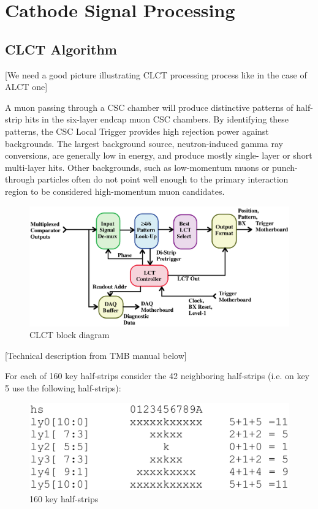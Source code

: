 \section{Cathode Signal Processing}
\label{sec:clct}

\subsection{CLCT Algorithm}
\label{subsec:clct_algo}

[We need a good picture illustrating CLCT processing process like in the case of ALCT one]

A muon passing through a CSC chamber will produce distinctive patterns of half-strip
hits in the six-layer endcap muon CSC chambers. By identifying these patterns, the CSC Local
Trigger provides high rejection power against backgrounds. The largest background source,
neutron-induced gamma ray conversions, are generally low in energy, and produce mostly single-
layer or short multi-layer hits. Other backgrounds, such as low-momentum muons or punch-
through particles often do not point well enough to the primary interaction region to be considered
high-momentum muon candidates.

\begin{figure}[tbh]
        \begin{center}
                \includegraphics[width=0.73\linewidth]{figures/CLCT_block_diagram.png}
                \caption{CLCT block diagram}
                \label{fig:clct_block_diagram}
        \end{center}
\end{figure}

[Technical description from TMB manual below]

For each of 160 key half-strips consider the 42 neighboring half-strips (i.e. on key 5 use the following half-strips):

\begin{figure}[tbh]
        \begin{center}
                \includegraphics[width=0.48\linewidth]{figures/160_key_half_strips.png}
                \caption{160 key half-strips}
                \label{fig:160_key_half_strips}
        \end{center}
\end{figure}

